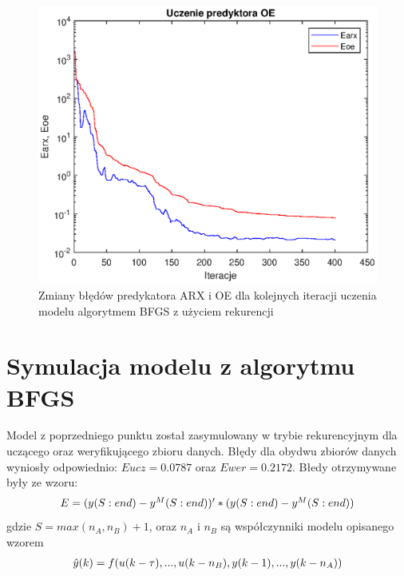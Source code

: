 		\begin{figure}[h!]
			\centering
			\includegraphics[width=\linewidth]{img/BFGS_OE_p.eps}
			\caption{Zmiany błędów predykatora ARX i OE dla kolejnych iteracji uczenia modelu algorytmem BFGS z użyciem rekurencji}
			\label{fig:bfgs_oe_p}
		\end{figure}
		
		\newpage
	\section{Symulacja modelu z algorytmu BFGS}
		\label{sec:bfgs_sym}
		Model z poprzedniego punktu został zasymulowany w trybie rekurencyjnym dla uczącego oraz weryfikującego zbioru danych. Błędy dla obydwu zbiorów danych wyniosły odpowiednio: $Eucz = 0.0787$ oraz $Ewer = 0.2172$. Błedy otrzymywane były ze wzoru:
		\begin{equation}
		\begin{tabular}{l}
		$E = (y(S:end)-y^M(S:end))'*(y(S:end)-y^M(S:end))$
		\end{tabular}
		\label{eq:error}
		\end{equation}
		gdzie $S = max(n_A,n_B)+1$, oraz $n_A$ i $n_B$ są współczynniki modelu opisanego wzorem
		\begin{equation}
		\begin{tabular}{l}
		$\hat{y}(k)=f(u(k-\tau),...,u(k-n_B),y(k-1),...,y(k-n_A))$
		\end{tabular}
		\label{eq:model_wzor}
		\end{equation}
		

